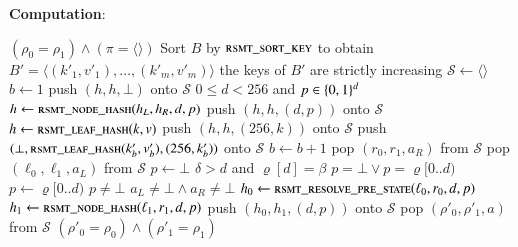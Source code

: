 \textbf{Computation}:
\begin{algorithmic}
			\State \Return $(\rho_0 = \rho_1) \land (\pi = \langle\rangle)$
		\EndIf
		\State Sort $B$ by $\textsc{rsmt\_sort\_key}$ to obtain $B' = \langle (k'_1, v'_1), \ldots, (k'_m, v'_m) \rangle$
		\State \Assert the keys of $B'$ are strictly increasing 
		\State $\mathcal{S} \gets \langle\rangle$ 
		\State $b \gets 1$ 
				\State push $(h, h, \bot)$ onto $\mathcal{S}$
				\State \Assert $0 \le d < 256$ and $p \in \{0,1\}^{d}$
				\State $h \gets \Call{rsmt\_node\_hash}{h_L, h_R, d, p}$
				\State push $(h, h, (d, p))$ onto $\mathcal{S}$
				\State $h \gets \Call{rsmt\_leaf\_hash}{k, v}$
				\State push $(h, h, (256, k))$ onto $\mathcal{S}$
				 \Return \FALSE \EndIf
				\State push $(\bot, \Call{rsmt\_leaf\_hash}{k'_b, v'_b}, (256, k'_b))$ onto $\mathcal{S}$
				\State $b \gets b + 1$
				 \Return \FALSE \EndIf
				\State pop $(r_0, r_1, a_R)$ from $\mathcal{S}$ 
				\State pop $(\ell_0, \ell_1, a_L)$ from $\mathcal{S}$ 
				\State $p \gets \bot$
				 
						\State \Assert $\delta > d$ and $\varrho[d] = \beta$
						\State \Assert $p = \bot \lor p = \varrho[0..d)$
						\State $p \gets \varrho[0..d)$
					\EndIf
				\EndFor
				\State \Assert $p \ne \bot$ 
				 
					\State \Assert $a_L \ne \bot \land a_R \ne \bot$ 
				\EndIf
				\State $h_0 \gets \Call{rsmt\_resolve\_pre\_state}{\ell_0, r_0, d, p}$
				\State $h_1 \gets \Call{rsmt\_node\_hash}{\ell_1, r_1, d, p}$
				\State push $(h_0, h_1, (d, p))$ onto $\mathcal{S}$
			\Else
				\State \Return \FALSE {}
			\EndIf
		\EndFor
			\State \Return \FALSE
		\EndIf
		\State pop $(\rho'_0, \rho'_1, a)$ from $\mathcal{S}$
		\State \Return $(\rho'_0 = \rho_0) \land (\rho'_1 = \rho_1)$
	\EndFunction
\end{algorithmic}

